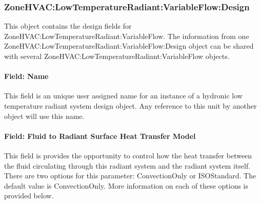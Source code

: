 \subsubsection{ZoneHVAC:LowTemperatureRadiant:VariableFlow:Design}\label{zonehvaclowtemperatureradiantvariableflowdesign}

This object contains the design fields for ZoneHVAC:LowTemperatureRadiant:VariableFlow. The information from one ZoneHVAC:LowTemperatureRadiant:VariableFlow:Design object can be shared with several ZoneHVAC:LowTemperatureRadiant:VariableFlow objects.

\paragraph{Field: Name}\label{hydrDesignObj}

This field is an unique user assigned name for an instance of a hydronic low temperature radiant system design object. Any reference to this unit by another object will use this name.

\paragraph{Field: Fluid to Radiant Surface Heat Transfer Model}\label{field-fluid-to-radiant-surface-heat-transfer-model-000}

This field is provides the opportunity to control how the heat transfer between the fluid circulating through this radiant system and the radiant system itself.  There are two options for this parameter: ConvectionOnly or ISOStandard.  The default value is ConvectionOnly.  More information on each of these options is provided below.

